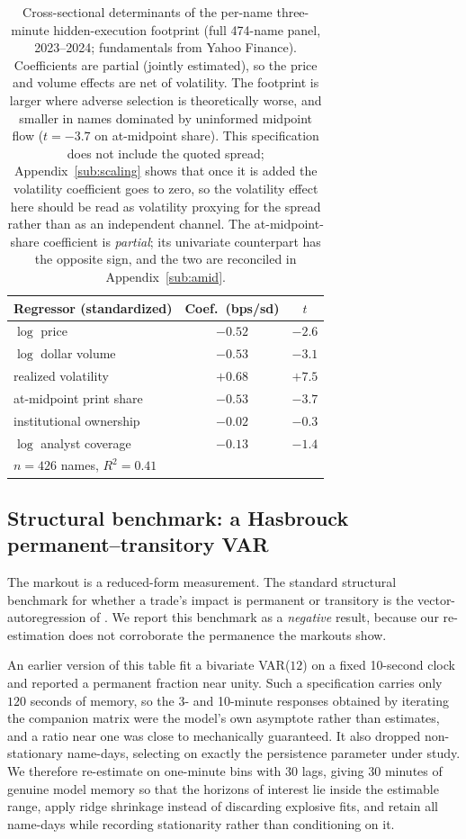 \documentclass[11pt]{article}
\begin{document}
\begin{table}[htbp]
\centering
\begin{tabular}{lcc}
\toprule
\textbf{Regressor (standardized)} & \textbf{Coef.\ (bps/sd)} & \textbf{$t$} \\
\midrule
$\log$ price & $-0.52$ & $-2.6$ \\
$\log$ dollar volume & $-0.53$ & $-3.1$ \\
realized volatility & $+0.68$ & $+7.5$ \\
at-midpoint print share & $-0.53$ & $-3.7$ \\
institutional ownership & $-0.02$ & $-0.3$ \\
$\log$ analyst coverage & $-0.13$ & $-1.4$ \\
\midrule
\multicolumn{3}{l}{$n=426$ names, $R^2 = 0.41$} \\
\bottomrule
\end{tabular}
\caption{Cross-sectional determinants of the per-name three-minute hidden-execution
footprint (full 474-name panel, 2023--2024; fundamentals from Yahoo Finance). Coefficients
are partial (jointly estimated), so the price and volume effects are net of volatility.
The footprint is larger where adverse selection is theoretically worse, and smaller in
names dominated by uninformed midpoint flow ($t{=}{-}3.7$ on at-midpoint share). This
specification does not include the quoted spread; Appendix~\ref{sub:scaling} shows that
once it is added the volatility coefficient goes to zero, so the volatility effect here
should be read as volatility proxying for the spread rather than as an independent channel.
The at-midpoint-share coefficient is \emph{partial}; its univariate counterpart has the
opposite sign, and the two are reconciled in Appendix~\ref{sub:amid}.}
\label{tab:determinants}
\end{table}

\subsection{Structural benchmark: a Hasbrouck permanent--transitory VAR}
\label{sub:hasbrouck}
The markout is a reduced-form measurement. The standard structural benchmark for whether a
trade's impact is permanent or transitory is the vector-autoregression of \citet{hasbrouck1991}.
We report this benchmark as a \emph{negative} result, because our re-estimation does not
corroborate the permanence the markouts show.

An earlier version of this table fit a bivariate VAR($12$) on a fixed 10-second clock and
reported a permanent fraction near unity. Such a specification carries only $120$ seconds of
memory, so the 3- and 10-minute responses obtained by iterating the companion matrix were
the model's own asymptote rather than estimates, and a ratio near one was close to
mechanically guaranteed. It also dropped non-stationary name-days, selecting on exactly the
persistence parameter under study. We therefore re-estimate on one-minute bins with 30 lags,
giving 30 minutes of genuine model memory so that the horizons of interest lie inside the
estimable range, apply ridge shrinkage instead of discarding explosive fits, and retain all
name-days while recording stationarity rather than conditioning on it.
\end{document}
